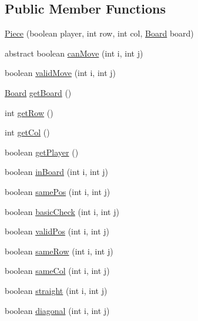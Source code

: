 \subsection*{Public Member Functions}
\begin{DoxyCompactItemize}
\item 
\mbox{\hyperlink{classmain_1_1_piece_a59bc157190f8a8e0b591170e2ba170d8}{Piece}} (boolean player, int row, int col, \mbox{\hyperlink{classmain_1_1_board}{Board}} board)
\item 
abstract boolean \mbox{\hyperlink{classmain_1_1_piece_a9f8dae1041fa90c31e2e54cd8a592bec}{can\+Move}} (int i, int j)
\item 
boolean \mbox{\hyperlink{classmain_1_1_piece_a952556ebac11683ccca77a7a07390472}{valid\+Move}} (int i, int j)
\item 
\mbox{\hyperlink{classmain_1_1_board}{Board}} \mbox{\hyperlink{classmain_1_1_piece_a4379392982c94b448a00c4a83f3d5552}{get\+Board}} ()
\item 
int \mbox{\hyperlink{classmain_1_1_piece_ac64b94e395aeccaa7775f64347008942}{get\+Row}} ()
\item 
int \mbox{\hyperlink{classmain_1_1_piece_a8bd82e7f1f966d64d6ae71ea6a1b2866}{get\+Col}} ()
\item 
boolean \mbox{\hyperlink{classmain_1_1_piece_afce632cbf2ecedfaffd75b3429cd9171}{get\+Player}} ()
\item 
boolean \mbox{\hyperlink{classmain_1_1_piece_ac37459803d206ec69e963d8ec80b18ab}{in\+Board}} (int i, int j)
\item 
boolean \mbox{\hyperlink{classmain_1_1_piece_ad00cbb2f2d2fc267a39bfb839b8b56ac}{same\+Pos}} (int i, int j)
\item 
boolean \mbox{\hyperlink{classmain_1_1_piece_a570604f7be083379527fc650508af42c}{basic\+Check}} (int i, int j)
\item 
boolean \mbox{\hyperlink{classmain_1_1_piece_adf43c89b35f525bc50f56d67df57c430}{valid\+Pos}} (int i, int j)
\item 
boolean \mbox{\hyperlink{classmain_1_1_piece_a59913ef35b6873e7b7e49f54cbd3f825}{same\+Row}} (int i, int j)
\item 
boolean \mbox{\hyperlink{classmain_1_1_piece_a5dff87dbb6683e90c752b29c0b1dd5b4}{same\+Col}} (int i, int j)
\item 
boolean \mbox{\hyperlink{classmain_1_1_piece_adb879d4da6b0570163f9581a038ad3a0}{straight}} (int i, int j)
\item 
boolean \mbox{\hyperlink{classmain_1_1_piece_a2fafcb060e3617e7f3da120aea09a36b}{diagonal}} (int i, int j)

\end{DoxyCompactItemize}
